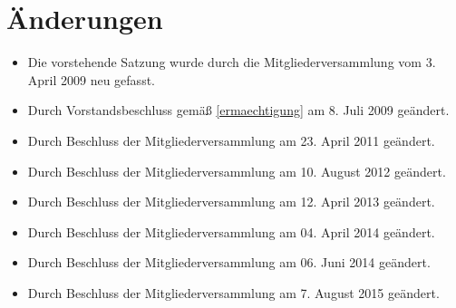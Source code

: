\documentclass[a4paper, 12pt]{scrartcl}
\begin{document}
\section*{Änderungen}
\begin{itemize}
	\item Die vorstehende Satzung wurde durch die Mitgliederversammlung vom 3. April 2009 neu gefasst.
	\item Durch Vorstandsbeschluss gemäß \ref{ermaechtigung} am 8. Juli 2009 geändert.
	\item Durch Beschluss der Mitgliederversammlung am 23. April 2011 geändert.
	\item Durch Beschluss der Mitgliederversammlung am 10. August 2012 geändert.
	\item Durch Beschluss der Mitgliederversammlung am 12. April 2013 geändert.
	\item Durch Beschluss der Mitgliederversammlung am 04. April 2014 geändert.
	\item Durch Beschluss der Mitgliederversammlung am 06. Juni 2014 geändert.
	\item Durch Beschluss der Mitgliederversammlung am 7. August 2015 geändert.
\end{itemize}
\end{document}

